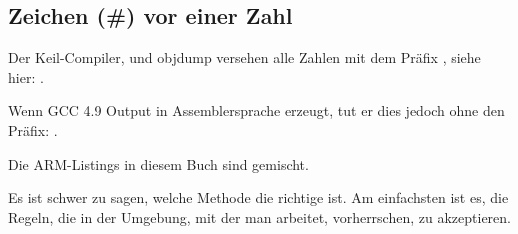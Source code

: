 
\subsection{Zeichen (\#) vor einer Zahl}
Der Keil-Compiler, \IDA und objdump versehen alle Zahlen mit dem Präfix \q{\#}, siehe hier:
.

Wenn GCC 4.9 Output in Assemblersprache erzeugt, tut er dies jedoch ohne den Präfix:
.

Die ARM-Listings in diesem Buch sind gemischt.

Es ist schwer zu sagen, welche Methode die richtige ist.
Am einfachsten ist es, die Regeln, die in der Umgebung, mit der man arbeitet, vorherrschen, zu akzeptieren.




